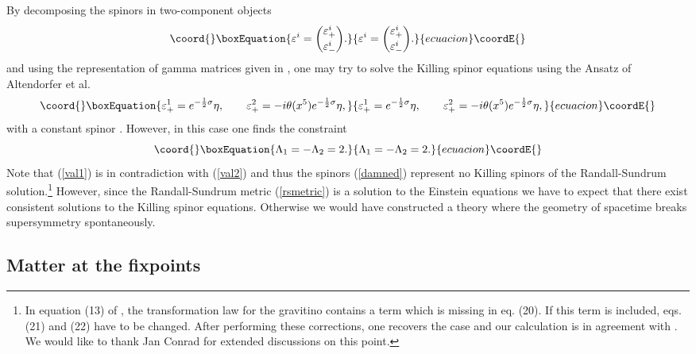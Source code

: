 \documentclass[a4paper,12pt, twoside]{article}
\numberwithin{equation}{section}
\begin{document}
By decomposing the spinors in two-component objects
\begin{equation}\coord{}\boxEquation{
\varepsilon^i=\binom{\varepsilon_+^i}{\varepsilon_-^i}.\label{zerl}
}{
\varepsilon^i=\binom{\varepsilon_+^i}{\varepsilon_-^i}.}{ecuacion}\coordE{}\end{equation}
and using the representation of gamma matrices given in 
\cite{Mirabelli:1998aj}, one may try to solve the Killing spinor equations 
\coordHE{} using the Ansatz of Altendorfer et al. \cite{Altendorfer:2000rr}
\begin{equation}\coord{}\boxEquation{
\varepsilon_+^1=e^{-\frac{1}{2}\sigma}\eta,\qquad 
\varepsilon_+^2=-i\theta(x^5)e^{-\frac{1}{2}\sigma}\eta,\label{damned}
}{
\varepsilon_+^1=e^{-\frac{1}{2}\sigma}\eta,\qquad 
\varepsilon_+^2=-i\theta(x^5)e^{-\frac{1}{2}\sigma}\eta,}{ecuacion}\coordE{}\end{equation}
with a constant spinor \myHighlight{$\eta$}\coordHE{}. However, in this case one finds the 
constraint 
\begin{equation}\coord{}\boxEquation{
\Lambda_1 = -\Lambda_2 =2.\label{val1}
}{
\Lambda_1 = -\Lambda_2 =2.}{ecuacion}\coordE{}\end{equation}
Note that (\ref{val1}) is in contradiction with (\ref{val2}) and thus 
the spinors (\ref{damned}) represent no Killing spinors of the 
Randall-Sundrum solution.\footnote{In equation (13) of 
\cite{Altendorfer:2000rr}, the transformation law for the gravitino \coordHE{} contains a term 
\coordHE{} which is missing in eq. 
(20). If this term is included, eqs. (21) and (22) have to be changed. 
After performing these corrections, one recovers the \coordHE{} case and our calculation is in agreement with 
\cite{Altendorfer:2000rr}. We would like to thank Jan Conrad for extended discussions on 
this point.} However, since the Randall-Sundrum metric (\ref{rsmetric}) 
is a solution to the Einstein equations we have to expect that there 
exist consistent solutions to the Killing spinor equations. Otherwise we 
would have constructed a theory where the geometry of spacetime breaks 
supersymmetry spontaneously.

\subsection{Matter at the fixpoints}\label{matt}
\end{document}
